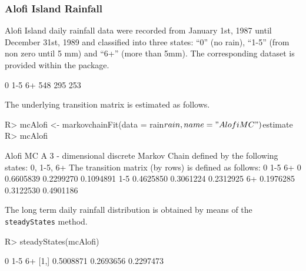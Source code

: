 \documentclass[
  nojss]{jss}
\begin{document}
\hypertarget{sec:wfAlofi}{%
\subsubsection{Alofi Island Rainfall}\label{sec:wfAlofi}}

Alofi Island daily rainfall
data were recorded from January 1st, 1987 until December 31st, 1989 and
classified into three states: ``0'' (no rain), ``1-5'' (from non zero until 5 mm) and ``6+'' (more than 5mm). The corresponding dataset is provided within the  package.

\begin{CodeChunk}


\begin{CodeOutput}

  0 1-5  6+ 
548 295 253 
\end{CodeOutput}
\end{CodeChunk}

The underlying transition matrix is estimated as follows.

\begin{CodeChunk}

\begin{CodeInput}
R> mcAlofi <- markovchainFit(data = rain$rain, name = "Alofi MC")$estimate
R> mcAlofi
\end{CodeInput}

\begin{CodeOutput}
Alofi MC 
 A  3 - dimensional discrete Markov Chain defined by the following states: 
 0, 1-5, 6+ 
 The transition matrix  (by rows)  is defined as follows: 
            0       1-5        6+
0   0.6605839 0.2299270 0.1094891
1-5 0.4625850 0.3061224 0.2312925
6+  0.1976285 0.3122530 0.4901186
\end{CodeOutput}
\end{CodeChunk}

The long term daily rainfall distribution is obtained by means of the \texttt{steadyStates} method.

\begin{CodeChunk}

\begin{CodeInput}
R> steadyStates(mcAlofi)
\end{CodeInput}

\begin{CodeOutput}
             0       1-5        6+
[1,] 0.5008871 0.2693656 0.2297473
\end{CodeOutput}
\end{CodeChunk}
\end{document}
